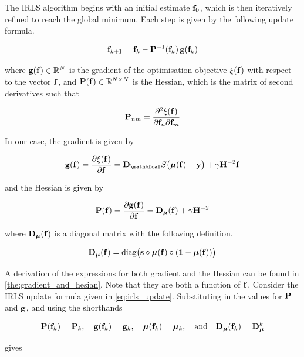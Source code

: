 The IRLS algorithm begins with an initial estimate $\mathbf{f}_0$, which is then iteratively refined to reach the global minimum. Each step is given by the following update formula. 

\begin{equation}
    \label{eq:irls_update}
    \mathbf{f}_{k+1} = \mathbf{f}_{k} - \mathbf{P}^{-1}(\mathbf{f}_k) \, \mathbf{g}(\mathbf{f}_k)
\end{equation}

where $ \mathbf{g}(\mathbf{f}) \in \mathbb{R}^N$ is the gradient of the optimisation objective $\xi(\mathbf{f})$ with respect to the vector $\mathbf{f}$, and $\mathbf{P}(\mathbf{f}) \in \mathbb{R}^{N \times N}$ is the Hessian, which is the matrix of second derivatives such that

\begin{equation*}
    \mathbf{P}_{nm} = \frac{\partial^2 \xi(\mathbf{f})}{\partial \mathbf{f}_n \partial \mathbf{f}_m}
\end{equation*}

In our case, the gradient is given by 

\begin{equation}
    \g(\f) = \frac{\partial \xi(\f)}{\partial \f} = \D_\St \big(\muu(\f) - \y\big) + \gamma \HH^{-2} \f
\end{equation}

and the Hessian is given by 

\begin{equation}
    \label{eq:logistic_gsr_P}
    \mathbf{P}(\mathbf{f}) = \frac{\partial \mathbf{g}(\mathbf{f})}{\partial \mathbf{f}} =  \mathbf{D}_{\boldsymbol{\mu}}(\mathbf{f}) + \gamma \mathbf{H}^{-2}
\end{equation}

where $\mathbf{D}_{\boldsymbol{\mu}}(\mathbf{f})$ is a diagonal matrix with the following definition. 

\begin{equation*}
    \mathbf{D}_{\boldsymbol{\mu}}(\mathbf{f}) = \text{diag}\big(\mathbf{s} \circ \boldsymbol{\mu}(\mathbf{f}) \circ (\mathbf{1} - \boldsymbol{\mu}(\mathbf{f}))\big)
\end{equation*}

A derivation of the expressions for both gradient and the Hessian can be found in \cref{the:gradient_and_hesian}. Note that they are both a function of $\mathbf{f}$. Consider the IRLS update formula given in \cref{eq:irls_update}. Substituting in the values for $\mathbf{P}$ and $\mathbf{g}$, and using the shorthands

\begin{equation*}
    \mathbf{P}(\mathbf{f}_k) = \mathbf{P}_k, \quad \mathbf{g}(\mathbf{f}_k) = \mathbf{g}_k, \quad \boldsymbol{\mu}(\mathbf{f}_k) = \boldsymbol{\mu}_k, \quad \text{and} \quad \mathbf{D}_{\boldsymbol{\mu}}(\mathbf{f}_k) = \mathbf{D}_{\boldsymbol{\mu}}^k
\end{equation*}

gives

